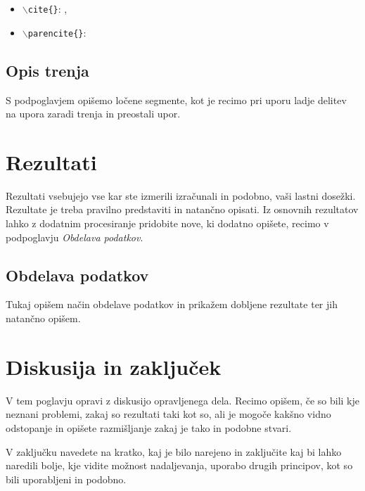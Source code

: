 \documentclass[pomnav, tisk]{fppthesis}
\begin{document}
\begin{itemize}
	\item \texttt{$\backslash$cite\{\}}: \cite{froude1888resistance},
	\item \texttt{$\backslash$parencite\{\}}: \parencite{froude1888resistance}
\end{itemize}

\subsection{Opis trenja}

S podpoglavjem opišemo ločene segmente, kot je recimo pri uporu ladje delitev na upora zaradi trenja in preostali upor. 


\newpage
\section{Rezultati}
\label{sec:Rezultati}

Rezultati vsebujejo vse kar ste izmerili izračunali in podobno, vaši lastni dosežki. Rezultate je treba pravilno predstaviti in natančno opisati. Iz osnovnih rezultatov lahko z dodatnim procesiranje pridobite nove, ki dodatno opišete, recimo v podpoglavju \textit{Obdelava podatkov}.

\subsection{Obdelava podatkov}

Tukaj opišem način obdelave podatkov in prikažem dobljene rezultate ter jih natančno opišem.


\newpage
\section{Diskusija in zaključek}
\label{sec:Diskusija}

V tem poglavju opravi z diskusijo opravljenega dela. Recimo opišem, če so bili kje neznani problemi, zakaj so rezultati taki kot so, ali je mogoče kakšno vidno odstopanje in opišete razmišljanje zakaj je tako in podobne stvari.

V zaključku navedete na kratko, kaj je bilo narejeno in zaključite kaj bi lahko naredili bolje, kje vidite možnost nadaljevanja, uporabo drugih principov, kot so bili uporabljeni in podobno.



\cleardoublepage
\singlespacing
{}
\printbibliography
\end{document}
